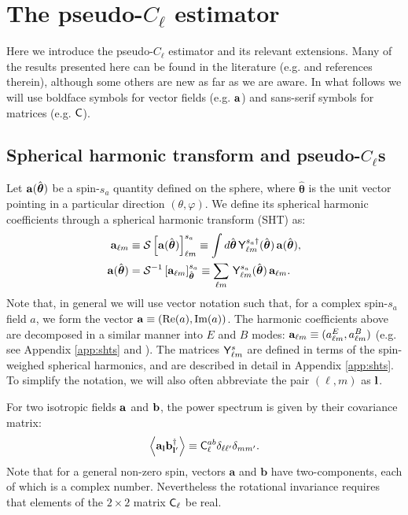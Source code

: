 \documentclass[usenatbib]{mnrasb}
\newcommand{\nv}{\hat{\boldsymbol{\theta}}}
\newcommand{\va}{{\mathbf{a}}}
\newcommand{\vb}{{\mathbf{b}}}
\begin{document}
  \section{The pseudo-\texorpdfstring{$C_\ell$}{Cl} estimator}\label{sec:maths}
    Here we introduce the pseudo-$C_\ell$ estimator and its relevant extensions. Many of the results presented here can be found in the literature (e.g. \cite{2002ApJ...567....2H,2003ApJS..148..161K,2006PhRvD..74h3002S,2009PhRvD..79l3515G,2013A&A...554A.112R,2017MNRAS.465.1847E} and references therein), although some others are new as far as we are aware. In what follows we will use boldface symbols for vector fields (e.g. ${\bf a}$) and sans-serif symbols for matrices (e.g. ${\sf C}$).
    
    \subsection{Spherical harmonic transform and pseudo-\texorpdfstring{$C_\ell$}{Cl}s}\label{ssec:maths.pcl101}
      Let ${\bf a}(\nv)$ be a spin-$s_a$ quantity defined on the sphere, where $\nv$ is the unit vector pointing in a particular direction $(\theta,\varphi)$. We define its spherical harmonic coefficients through a spherical harmonic transform (SHT) as:
      \begin{align}\label{eq:sht1}
        {\bf a}_{\ell m}&\equiv\mathcal{S}\left[{\bf a}(\nv)\right]^{s_a}_{\ell m}\equiv\int d\nv\,{\sf Y}^{s_a\dag}_{\ell m}(\nv)\,{\bf a}(\nv), \\\label{eq:sht2}
        {\bf a}(\nv)&=\mathcal{S}^{-1}\left[{\bf a}_{\ell m}\right]^{s_a}_{\nv}\equiv\sum_{\ell m}\,{\sf Y}^{s_a}_{\ell m}(\nv)\,{\bf a}_{\ell m}.
      \end{align}
      Note that, in general we will use vector notation such that, for a complex spin-$s_a$ field $a$, we form the vector ${\bf a}\equiv({\rm Re}(a),{\rm Im}(a))$. The harmonic coefficients above are decomposed in a similar manner into $E$ and $B$ modes: ${\bf a}_{\ell m}\equiv(a^E_{\ell m},a^B_{\ell m})$ (e.g. see Appendix \ref{app:shts} and \cite{1997PhRvD..55.1830Z}). The matrices ${\sf Y}^s_{\ell m}$ are defined in terms of the spin-weighed spherical harmonics, and are described in detail in Appendix \ref{app:shts}. To simplify the notation, we will also often abbreviate the pair $(\ell,m)$ as ${\bf l}$. 
      
      For two isotropic fields ${\bf a}$ and ${\bf b}$, the power spectrum is given by their covariance matrix:
      \begin{equation}\label{eq:cldef}
        \left\langle{\bf a}_{\bf l}{\bf b}_{{\bf l}'}^\dag\right\rangle\equiv{\sf C}^{ab}_\ell\delta_{\ell\ell'}\delta_{mm'}.
      \end{equation}
      Note that for a general non-zero spin, vectors $\va$ and $\vb$ have two-components, each of which is a complex number. Nevertheless the rotational invariance requires that elements of the $2\times2$ matrix ${\sf C}_\ell$ be real.
\end{document}
